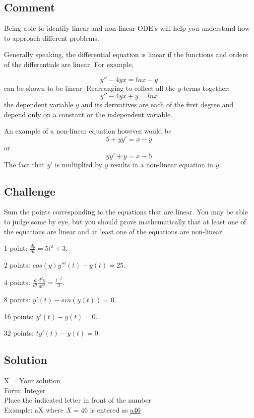 \subsection*{Comment}
Being able to identify linear and non-linear ODE's will help you understand how to approach different problems.

Generally speaking, the differential equation is linear if the functions and orders of the differentials are linear. For example, 

\begin{equation*}
    y'' - 4yx = ln x - y
\end{equation*}
can be shown to be linear. Rearranging to collect all the $y$-terms together:
\begin{equation*}
    y'' - 4yx + y = ln x
\end{equation*}
the dependent variable $y$ and its derivatives are each of the first degree and depend only on a constant or the independent variable.

An example of a non-linear equation however would be
\begin{equation*}
    5 + yy' = x - y
\end{equation*}
or
\begin{equation*}
    yy' + y = x - 5
\end{equation*}
The fact that $y'$ is multiplied by $y$ results in a non-linear equation in $y$.

\subsection*{Challenge}
Sum the points corresponding to the equations that are linear. You may be able to judge some by eye, but you should prove mathematically that at least one of the equations are linear and at least one of the equations are non-linear.

1 point: $\displaystyle \frac{dy}{dt} = 5t^3 + 3$.

2 points: $\displaystyle cos(y) y'''(t) - y(t) = 25$.

4 points: $\displaystyle \frac{d}{dt} \frac{d^2 y}{dt^2} = \frac{t^{-2}}{3}$.

8 points: $\displaystyle y'(t) - sin(y(t)) = 0$.

16 points: $\displaystyle y'(t) - y(t) = 0$.

32 points: $\displaystyle t y'(t) - y(t) = 0$.

\subsection*{Solution}
X = Your solution\\
Form: Integer\\
Place the indicated letter in front of the number\\
Example: aX where $X=46$ is entered as \href{http://www.wolframalpha.com/input/?i=md5+hash+of+\%22a46\%22}{a46}

